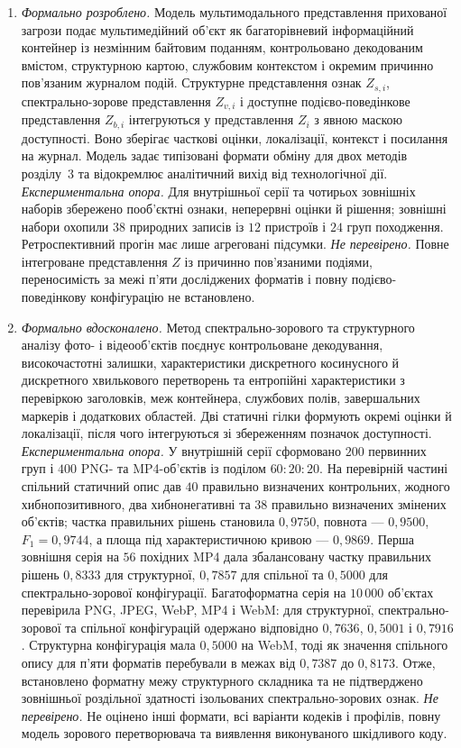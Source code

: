 \begin{enumerate}[label=\arabic*.]
\item \textit{Формально розроблено.} Модель мультимодального представлення прихованої загрози подає мультимедійний об’єкт як багаторівневий інформаційний контейнер із незмінним байтовим поданням, контрольовано декодованим вмістом, структурною картою, службовим контекстом і окремим причинно пов’язаним журналом подій. Структурне представлення ознак $Z_{s,i}$, спектрально-зорове представлення $Z_{v,i}$ і доступне подієво-поведінкове представлення $Z_{b,i}$ інтегруються у представлення $Z_i$ з явною маскою доступності. Воно зберігає часткові оцінки, локалізації, контекст і посилання на журнал. Модель задає типізовані формати обміну для двох методів розділу~3 та відокремлює аналітичний вихід від технологічної дії. \textit{Експериментальна опора.} Для внутрішньої серії та чотирьох зовнішніх наборів збережено пооб’єктні ознаки, неперервні оцінки й рішення; зовнішні набори охопили $38$ природних записів із $12$ пристроїв і $24$ груп походження. Ретроспективний прогін має лише агреговані підсумки. \textit{Не перевірено.} Повне інтегроване представлення $Z$ із причинно пов’язаними подіями, переносимість за межі п’яти досліджених форматів і повну подієво-поведінкову конфігурацію не встановлено.

\item \textit{Формально вдосконалено.} Метод спектрально-зорового та структурного аналізу фото- і відеооб’єктів поєднує контрольоване декодування, високочастотні залишки, характеристики дискретного косинусного й дискретного хвилькового перетворень та ентропійні характеристики з перевіркою заголовків, меж контейнера, службових полів, завершальних маркерів і додаткових областей. Дві статичні гілки формують окремі оцінки й локалізації, після чого інтегруються зі збереженням позначок доступності. \textit{Експериментальна опора.} У внутрішній серії сформовано $200$ первинних груп і $400$ PNG- та MP4-об’єктів із поділом $60:20:20$. На перевірній частині спільний статичний опис дав $40$ правильно визначених контрольних, жодного хибнопозитивного, два хибнонегативні та $38$ правильно визначених змінених об’єктів; частка правильних рішень становила $0{,}9750$, повнота --- $0{,}9500$, $F_1=0{,}9744$, а площа під характеристичною кривою --- $0{,}9869$. Перша зовнішня серія на $56$ похідних MP4 дала збалансовану частку правильних рішень $0{,}8333$ для структурної, $0{,}7857$ для спільної та $0{,}5000$ для спектрально-зорової конфігурації. Багатоформатна серія на $10\,000$ об’єктах перевірила PNG, JPEG, WebP, MP4 і WebM: для структурної, спектрально-зорової та спільної конфігурацій одержано відповідно $0{,}7636$, $0{,}5001$ і $0{,}7916$. Структурна конфігурація мала $0{,}5000$ на WebM, тоді як значення спільного опису для п’яти форматів перебували в межах від $0{,}7387$ до $0{,}8173$. Отже, встановлено форматну межу структурного складника та не підтверджено зовнішньої роздільної здатності ізольованих спектрально-зорових ознак. \textit{Не перевірено.} Не оцінено інші формати, всі варіанти кодеків і профілів, повну модель зорового перетворювача та виявлення виконуваного шкідливого коду.


\end{enumerate}
